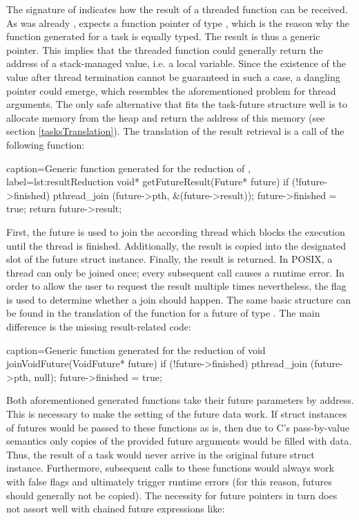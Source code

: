 The signature of  indicates how the result of a threaded function can be received. As was already ,  expects a function pointer of type , which is the reason why the function generated for a task is equally typed. The result is thus a generic  pointer. This implies that the threaded function could generally return the address of a stack-managed value, i.e. a local variable. Since the existence of the value after thread termination cannot be guaranteed in such a case, a dangling pointer \cite{UnderstandingAndUsingCPointers} could emerge, which resembles the aforementioned problem for thread arguments. The only safe alternative that fits the task-future structure well is to allocate memory from the heap and return the address of this memory (see section \ref{tasksTranslation}). The translation of the result retrieval is a call of the following function:

\begin{ccode}{caption=Generic function generated for the reduction of , label=lst:resultReduction}
void* getFutureResult(Future* future) { 
  if (!future->finished) { 
    pthread_join (future->pth, &(future->result)); 
    future->finished = true; 
  } 
  return future->result; 
} 
\end{ccode}
First, the future is used to join the according thread which blocks the execution until the thread is finished. Additionally, the result is copied into the designated slot of the future struct instance. Finally, the result is returned. In POSIX, a thread can only be joined once; every subsequent call causes a runtime error. In order to allow the user to request the result multiple times nevertheless, the  flag is used to determine whether a join should happen. The same basic structure can be found in the translation of the  function for a future of type . The main difference is the missing result-related code:
\begin{ccode}{caption=Generic function generated for the reduction of }
void joinVoidFuture(VoidFuture* future) { 
  if (!future->finished) { 
    pthread_join (future->pth, null); 
    future->finished = true; 
  }
}
\end{ccode}
Both aforementioned generated functions take their future parameters by address. This is necessary to make the setting of the future data work. If struct instances of futures would be passed to these functions as is, then due to C's pass-by-value semantics only copies of the provided future arguments would be filled with data. Thus, the result of a task would never arrive in the original future struct instance. Furthermore, subsequent calls to these functions would always work with false  flags and ultimately trigger runtime errors (for this reason, futures should generally not be copied). The necessity for future pointers in turn does not assort well with chained future expressions like:


